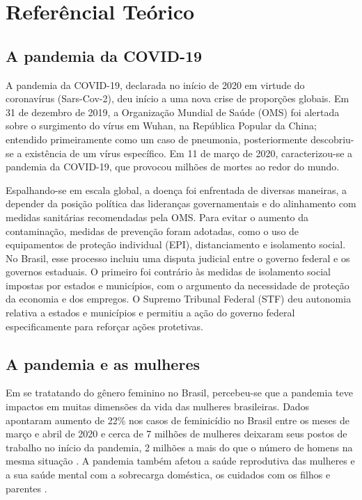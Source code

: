 \section{Referêncial Teórico}

\subsection{A pandemia da COVID-19}

A pandemia da COVID-19, declarada no início de 2020 em virtude do coronavírus (Sars-Cov-2), deu início a uma nova crise de proporções globais. Em 31 de dezembro de 2019, a Organização Mundial de Saúde (OMS) foi alertada sobre o surgimento do vírus em Wuhan, na República Popular da China; entendido primeiramente como um caso de pneumonia, posteriormente descobriu-se a existência de um vírus específico. Em 11 de março de 2020, caracterizou-se a pandemia da COVID-19, que provocou milhões de mortes ao redor do mundo. 

Espalhando-se em escala global, a doença foi enfrentada de diversas maneiras, a depender da posição política das lideranças governamentais e do alinhamento com medidas sanitárias recomendadas pela OMS. Para evitar o aumento da contaminação, medidas de prevenção foram adotadas, como o uso de equipamentos de proteção individual (EPI), distanciamento e isolamento social. No Brasil, esse processo incluiu uma disputa judicial entre o governo federal e os governos estaduais. O primeiro foi contrário às medidas de isolamento social impostas por estados e municípios, com o argumento da necessidade de proteção da economia e dos empregos. O Supremo Tribunal Federal (STF) deu autonomia relativa a estados e municípios e permitiu a ação do governo federal especificamente para reforçar ações protetivas. 

\subsection{A pandemia e as mulheres}

Em se tratatando do gênero feminino no Brasil, percebeu-se que a pandemia teve impactos em muitas dimensões da vida das mulheres brasileiras. Dados apontaram aumento de 22\% nos casos de feminicídio no Brasil entre os meses de março e abril de 2020 e cerca de 7 milhões de mulheres deixaram seus postos de trabalho no início da pandemia, 2 milhões a mais do que o número de homens na mesma situação \cite{pandemia_impacta_mulheres}. A pandemia também afetou a saúde reprodutiva das mulheres e a sua saúde mental com a sobrecarga doméstica, os cuidados com os filhos e parentes \cite{pandemia_impacta_saude_mulheres}.

